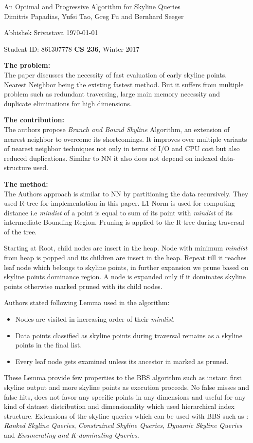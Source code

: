 \documentclass[a4paper,12pt, twoside]{article}
\renewcommand{\maketitle}{%
 	\Large
 	\begin{center}
 	An Optimal and Progressive Algorithm for Skyline Queries\\	
 	\normalsize Dimitris Papadias, Yufei Tao, Greg Fu and Bernhard Seeger
 	\end{center}
 
 	\Large
	Abhishek Srivastava
	\hfill
	\normalsize
	\today
 	\par
 	Student ID: 861307778
 	\hfill
 	\textbf{CS 236}, Winter 2017
 	\par 	
 	\hrulefill
 	\par
 	}
\begin{document}
\thispagestyle{empty}
	
\maketitle
\textbf{The problem:}\\
The paper discusses the necessity of fast evaluation of early skyline points. Nearest Neighbor being the existing fastest method. But it suffers from multiple problem such as redundant traversing, large main memory necessity and duplicate eliminations for high dimensions.  

\textbf{The contribution:}\\
The authors propose \emph{Branch and Bound Skyline} Algorithm, an extension of nearest neighbor to overcome its shortcomings. It improves over multiple variants of nearest neighbor techniques not only in terms of I/O and CPU cost but also reduced duplications. Similar to NN it also does not depend on indexed data-structure used.

\textbf{The method:}\\
The Authors approach is similar to NN by partitioning the data recursively. They used R-tree for implementation in this paper.  L1 Norm is used for computing distance i.e \emph{mindist} of a point is equal to sum of its point with \emph{mindist} of its intermediate Bounding Region. Pruning is applied to the R-tree during traversal of the tree.

Starting at Root, child nodes are insert in the heap. Node with minimum \emph{mindist} from heap is popped and its children are insert in the heap. Repeat till it reaches leaf node which belongs to skyline points, in further expansion we prune based on skyline points dominance region. A node is expanded only if it dominates skyline points otherwise marked pruned with its child nodes.

Authors stated following Lemma used in the algorithm: 
\begin{itemize}
	\item Nodes are visited in increasing order of their \emph{mindist}.
	\item Data points classified as skyline points during traversal remains as a skyline points in the final list.
	\item Every leaf node gets examined unless its ancestor in marked as pruned. 
\end{itemize}
These Lemma provide few properties to the BBS algorithm such as instant first skyline output and more skyline points as execution proceeds, No false misses and false hits, does not favor any specific points in any dimensions and useful for any kind of dataset distribution and dimensionality which used hierarchical index structure. Extensions of the skyline queries which can be used with BBS such as : \emph{Ranked Skyline Queries}, \emph{Constrained Skyline Queries}, \emph{Dynamic Skyline Queries} and \emph{Enumerating and K-dominating Queries}.
\end{document}
